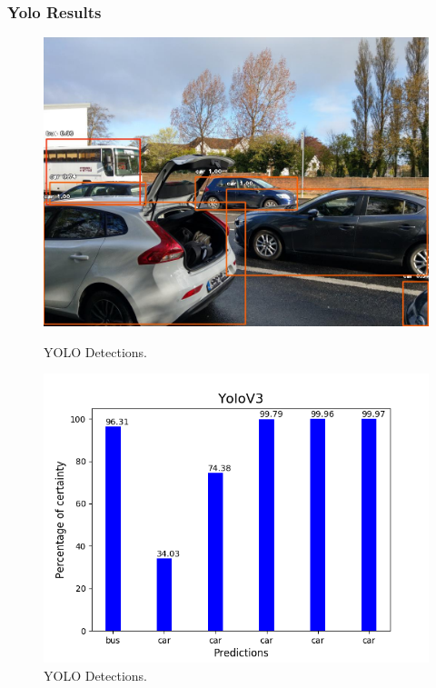     \newpage

    \subsubsection{Yolo Results}

    \begin{figure}[htb]
        \centering
        \begin{minipage}[b]{0.44\textwidth}
          \includegraphics[width=\textwidth]{Sections/4InitialWork/4_images_obj_run1/yolo.jpg}
          \caption{YOLO Detections.}
        \end{minipage}
        \hfill
        \begin{minipage}[b]{0.50\textwidth}
          \includegraphics[width=\textwidth]{Sections/4InitialWork/4_images_obj_run1/yolo_graph.png}
          \caption{YOLO Detections.}
        \end{minipage}
      \end{figure}
    
